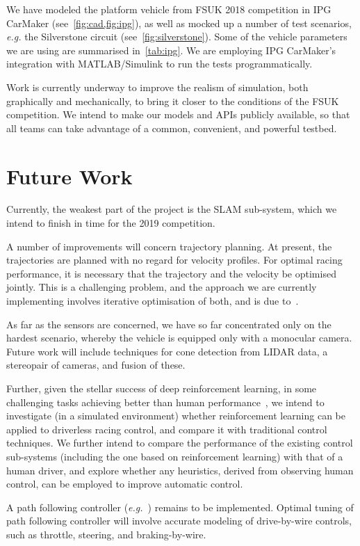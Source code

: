 \documentclass[a4paper, 10pt, conference]{ieeeconf}      %
\begin{document}
We have modeled the platform vehicle from FSUK 2018 competition in IPG
CarMaker (see~\cref{fig:cad,fig:ipg}), as well as mocked up a number of test scenarios,
\emph{e.g.} the Silverstone circuit (see~\cref{fig:silverstone}). Some of the vehicle
parameters we are using are summarised in~\cref{tab:ipg}. We are employing IPG
CarMaker's integration with MATLAB/Simulink to run the tests programmatically.

Work is currently underway to improve the realism of simulation, both
graphically and mechanically, to bring it closer to the conditions of the FSUK
competition. We intend to make our models and APIs publicly available, so that
all teams can take advantage of a common, convenient, and powerful testbed.


\section{Future Work}
Currently, the weakest part of the project is the SLAM sub-system, which we
intend to finish in time for the 2019 competition.

A number of improvements will concern trajectory planning. At
present, the trajectories are planned with no regard for velocity
profiles. For optimal racing performance, it is necessary that the trajectory
and the velocity be optimised jointly.  This is a challenging problem, and the
approach we are currently implementing involves iterative optimisation of
both, and is due to~\cite{xu12}.

As far as the sensors are concerned, we have so far concentrated only on the
hardest scenario, whereby the vehicle is equipped only with a monocular
camera. Future work will include techniques for cone detection from LIDAR
data, a stereopair of cameras, and fusion of these.

Further, given the stellar success of deep reinforcement learning, in some challenging
tasks achieving better than human performance~\cite{mnih15}, we intend to
investigate (in a simulated environment) whether reinforcement learning can be
applied to driverless racing control, and compare it with traditional control
techniques.
We further intend to compare the performance of the existing control
sub-systems (including the one based on reinforcement learning) with that of a
human driver, and explore whether any heuristics, derived from observing
human control, can be employed to improve automatic control.

A path following controller (\emph{e.g.}~\cite{ni17}) remains to be implemented. Optimal tuning of path following
controller will involve accurate modeling of drive-by-wire controls, such as
throttle, steering, and braking-by-wire.
\end{document}
